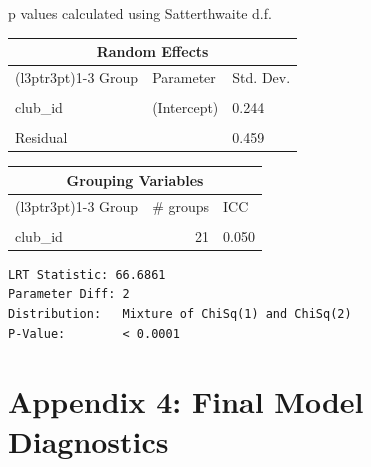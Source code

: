 \documentclass[
  12pt]{article}
\begin{document}
\begin{table}[!h]
\begin{threeparttable}
\begin{tabular}{lrrrrr}
\bottomrule
\end{tabular}
\begin{tablenotes}
\item  p values calculated using Satterthwaite d.f. 
\end{tablenotes}
\end{threeparttable}
\end{table} \begin{table}[!h]
\centering
\begin{tabular}{lll}
\toprule
\multicolumn{3}{c}{Random Effects} \\
\cmidrule(l{3pt}r{3pt}){1-3}
Group & Parameter & Std. Dev.\\
\midrule
\cellcolor{gray!10}{player\_id} & \cellcolor{gray!10}{(Intercept)} & \cellcolor{gray!10}{0.959}\\
club\_id & (Intercept) & 0.244\\
\cellcolor{gray!10}{club\_id} & \cellcolor{gray!10}{season\_year\_c} & \cellcolor{gray!10}{0.019}\\
Residual &  & 0.459\\
\bottomrule
\end{tabular}
\end{table} \begin{table}[!h]
\centering
\begin{tabular}{lrl}
\toprule
\multicolumn{3}{c}{Grouping Variables} \\
\cmidrule(l{3pt}r{3pt}){1-3}
Group & \# groups & ICC\\
\midrule
\cellcolor{gray!10}{player\_id} & \cellcolor{gray!10}{2159} & \cellcolor{gray!10}{0.773}\\
club\_id & 21 & 0.050\\
\bottomrule
\end{tabular}
\end{table}

\clearpage

\newpage

\begin{verbatim}
LRT Statistic: 66.6861 
Parameter Diff: 2 
Distribution:   Mixture of ChiSq(1) and ChiSq(2) 
P-Value:        < 0.0001 
\end{verbatim}

\newpage

\section{Appendix 4: Final Model
Diagnostics}\label{appendix-4-final-model-diagnostics}
\end{document}
